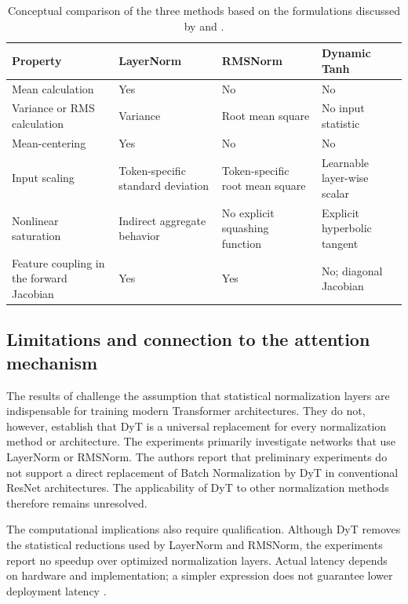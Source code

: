 \begin{table}[htbp]
    \centering
    \small
    \setlength{\tabcolsep}{3pt}
    \caption{Conceptual comparison of the three methods based on the
    formulations discussed by \textcite{zhu2025dyt} and
    \textcite{corradini2025slmreview}.}
    \label{tab:norm-method-comparison}
    \begin{tabularx}{\textwidth}{p{}XXX}
        \toprule
        Property & LayerNorm & RMSNorm & Dynamic Tanh \\
        \midrule
        Mean calculation
        & Yes
        & No
        & No \\
        Variance or RMS calculation
        & Variance
        & Root mean square
        & No input statistic \\
        Mean-centering
        & Yes
        & No
        & No \\
        Input scaling
        & Token-specific standard deviation
        & Token-specific root mean square
        & Learnable layer-wise scalar \\
        Nonlinear saturation
        & Indirect aggregate behavior
        & No explicit squashing function
        & Explicit hyperbolic tangent \\
        Feature coupling in the forward Jacobian
        & Yes
        & Yes
        & No; diagonal Jacobian \\
        \bottomrule
    \end{tabularx}
\end{table}

\subsection{Limitations and connection to the attention mechanism}
\label{subsec:norm-limitations-transition}

The results of \textcite{zhu2025dyt} challenge the assumption that
statistical normalization layers are indispensable for training modern
Transformer architectures. They do not, however, establish that DyT is
a universal replacement for every normalization method or architecture.
The experiments primarily investigate networks that use LayerNorm or
RMSNorm. The authors report that preliminary experiments do not support
a direct replacement of Batch Normalization by DyT in conventional
ResNet architectures. The applicability of DyT to other normalization
methods therefore remains unresolved.

The computational implications also require qualification. Although
DyT removes the statistical reductions used by LayerNorm and RMSNorm,
the experiments report no speedup over optimized normalization layers.
Actual latency depends on hardware and implementation; a simpler
expression does not guarantee lower deployment latency
\parencite{zhu2025dyt}.

